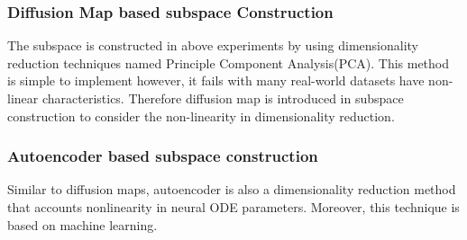 \documentclass[12pt,a4paper]{article}
\begin{document}
\subsubsection{Diffusion Map based subspace Construction}
The subspace is constructed in above experiments by using dimensionality reduction techniques named Principle Component Analysis(PCA). This method is simple to implement however, it fails with many real-world datasets have non-linear characteristics. Therefore diffusion map is introduced in subspace construction to consider the non-linearity in dimensionality reduction.

\subsubsection{Autoencoder based subspace construction}
Similar to diffusion maps, autoencoder is also a dimensionality reduction method that accounts nonlinearity in neural ODE parameters. Moreover, this technique is  based on machine learning. 
\end{document}
